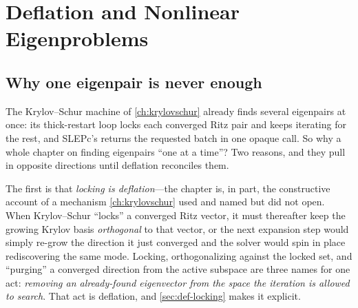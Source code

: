 \chapter{Deflation and Nonlinear Eigenproblems}
\label{ch:deflation}


\section{Why one eigenpair is never enough}
\label{sec:def-why}

The Krylov--Schur machine of \cref{ch:krylovschur} already finds several
eigenpairs at once: its thick-restart loop locks each converged Ritz pair and
keeps iterating for the rest, and SLEPc's  returns the requested
batch in one opaque call. So why a whole chapter on finding eigenpairs ``one at a
time''? Two reasons, and they pull in opposite directions until deflation
reconciles them.

The first is that \emph{locking is deflation}---the chapter is, in part, the
constructive account of a mechanism \cref{ch:krylovschur} used and named but did
not open. When Krylov--Schur ``locks'' a converged Ritz vector, it must thereafter
keep the growing Krylov basis \emph{orthogonal} to that vector, or the next
expansion step would simply re-grow the direction it just converged and the
solver would spin in place rediscovering the same mode. Locking, orthogonalizing
against the locked set, and ``purging'' a converged direction from the active
subspace are three names for one act: \emph{removing an already-found eigenvector
from the space the iteration is allowed to search}. That act is deflation, and
\cref{sec:def-locking} makes it explicit.

